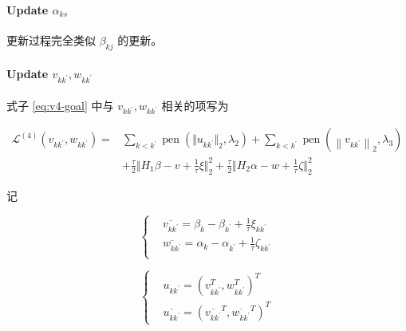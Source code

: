 \documentclass[12pt, a4paper, oneside]{article}
\numberwithin{equation}{section}
\begin{document}
\paragraph{Update $\alpha_{ks}$}

更新过程完全类似 $\beta_{kj}$ 的更新。

\paragraph{Update $v_{kk^\prime},w_{kk^\prime}$}


式子 \ref{eq:v4-goal} 中与 $v_{kk^\prime},w_{kk^\prime}$ 相关的项写为

\begin{equation}
	\begin{aligned}
		\mathcal{L}^{(4)}(v_{kk^\prime},w_{kk^\prime})=&\sum_{k<k^{\prime}} \operatorname{pen}\left(\Vert u_{kk^\prime}\Vert_2, \lambda_{2}\right) + \sum_{k<k^{\prime}} \operatorname{pen}\left(\left\|v_{kk^\prime}\right\|_{2}, \lambda_{3}\right) \\
		&+ \frac{\tau}{2}\Vert H_1 \beta - v + \frac{1}{\tau}\xi\Vert_2^2 + \frac{\tau}{2}\Vert H_2 \alpha - w + \frac{1}{\tau}\zeta\Vert_2^2
	\end{aligned}
\end{equation}

记

\begin{equation}
	\left\{
	\begin{aligned}
		&\overline{v_{k{k^\prime}}} = \beta_k - \beta_{k^\prime} + \frac{1}{\tau}\xi_{k{k^\prime}}\\
		&\overline{w_{k{k^\prime}}} = \alpha_k - \alpha_{k^\prime} + \frac{1}{\tau}\zeta_{k{k^\prime}}\\
	\end{aligned}
	\right.
\end{equation}

\begin{equation}
	\left\{
	\begin{aligned}
		&u_{k{k^\prime}} = (v^T_{kk^\prime}, w^T_{kk^\prime})^T\\
		&\overline{u_{k{k^\prime}}} = (\overline{v_{kk^\prime}}^T, \overline{w_{kk^\prime}}^T)^T
	\end{aligned}
	\right.
\end{equation}
\end{document}
